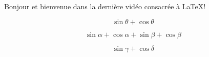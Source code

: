\documentclass[a4paper,12pt]{article}
\newcommand{\comA}{\sin\theta + \cos\theta}
\newcommand{\comB}[1]{\sin #1 + \cos #1}
\newcommand{\comC}[2]{\sin #1 + \cos #2}
\begin{document}
Bonjour et bienvenue dans la dernière vidéo consacrée à \LaTeX !

\begin{equation}
  \comA
\end{equation}

\begin{equation}
  \comB{\alpha} + \comB{\beta}
\end{equation}

\begin{equation}
  \comC{\gamma}{\delta}
\end{equation}
\end{document}
